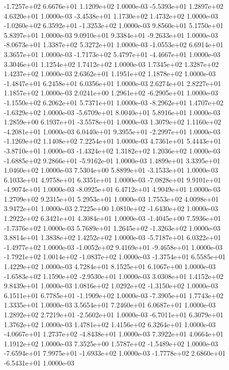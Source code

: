 -1.7257e+02  6.6676e+01  1.1209e+02  1.0000e-03
-5.5393e+01  1.2897e+02  4.6320e+01  1.0000e-03
-3.4538e+01  1.1730e+02  1.4732e+02  1.0000e-03
-1.0260e+02  6.3592e+01 -1.3253e+02  1.0000e-03
9.8560e+01 5.1750e+01 5.8397e+01  1.0000e-03
 9.0910e+01  9.3384e+01 -9.2633e+01  1.0000e-03
-8.0673e+01  1.3387e+02  5.3272e+01  1.0000e-03
-1.0553e+02  6.6914e+01  3.3657e+01  1.0000e-03
-1.7173e+02  5.4797e+01 -4.4667e+01  1.0000e-03
3.3046e+01 1.1254e+02 1.7412e+02  1.0000e-03
1.7345e+02 1.3287e+02 1.4237e+02  1.0000e-03
2.6362e+01 1.1951e+02 1.1878e+02  1.0000e-03
-1.4847e+01  6.2458e+01  6.0356e+01  1.0000e-03
2.6274e+01 2.8227e+01 1.1857e+02  1.0000e-03
 2.0241e+00  1.2961e+02 -6.2905e+01  1.0000e-03
-1.1550e+02  6.2062e+01  5.7371e+01  1.0000e-03
-8.2962e+01  1.4707e+02 -1.6329e+02  1.0000e-03
-5.6709e+01  8.0040e+01  5.8916e+01  1.0000e-03
 1.2859e+00  6.1937e+01 -3.5578e+01  1.0000e-03
 1.3079e+02  1.1160e+02 -4.2081e+01  1.0000e-03
 6.0440e+01  9.3955e+01 -2.2997e+01  1.0000e-03
-1.1269e+02  1.1408e+02  7.2254e+01  1.0000e-03
 4.7361e+01  5.4443e+01 -3.8710e+01  1.0000e-03
-1.4324e+02  1.3182e+02  1.2036e+02  1.0000e-03
-1.6885e+02  9.2866e+01 -5.9162e-01  1.0000e-03
1.4899e+01 3.3395e+01 1.0460e+02  1.0000e-03
 7.5304e+00  5.8899e+01 -3.1533e+01  1.0000e-03
6.1033e+01 4.9758e+01 6.3351e+01  1.0000e-03
-7.0828e+01  9.9101e+01 -4.9074e+01  1.0000e-03
-8.0925e+01  6.4712e+01  4.9049e+01  1.0000e-03
1.2709e+02 9.2315e+01 5.2953e+01  1.0000e-03
1.7553e+02 4.0098e+01 3.9472e+01  1.0000e-03
 2.7225e+00  1.0810e+02 -1.6430e+02  1.0000e-03
1.2922e+02 6.3421e+01 4.3084e+01  1.0000e-03
-1.4045e+00  7.5936e+01 -1.7376e+02  1.0000e-03
 5.7689e+01  1.2645e+02 -1.3263e+02  1.0000e-03
3.8814e+01 1.3838e+02 1.4252e+02  1.0000e-03
-5.7187e+01  6.0322e+01 -1.4977e+02  1.0000e-03
-1.0052e+02  9.4169e+01 -9.4658e+01  1.0000e-03
-1.7921e+02  1.0014e+02 -1.0837e+02  1.0000e-03
-1.3754e+01  6.5585e+01  1.4229e+02  1.0000e-03
4.7284e+01 8.1525e+01 6.1067e+00  1.0000e-03
-1.6583e+02  1.1590e+02 -2.9530e+01  1.0000e-03
3.0308e+01 1.4152e+02 9.8439e+01  1.0000e-03
 1.0816e+02  1.0292e+02 -1.3150e+02  1.0000e-03
 6.1511e+01  6.7785e+01 -1.1909e+02  1.0000e-03
-7.3905e+01  1.7743e+02  1.3335e+01  1.0000e-03
3.5654e+01 7.2460e+01 6.0687e+01  1.0000e-03
 1.2892e+02  2.7219e+01 -2.5602e+01  1.0000e-03
-6.7011e+01  6.3079e+01  1.3762e+02  1.0000e-03
1.4781e+02 1.4156e+02 6.3264e+01  1.0000e-03
-4.0667e+01  1.2737e+02 -4.8438e+01  1.0000e-03
7.3922e+01 4.0664e+01 1.1912e+02  1.0000e-03
 7.3525e+00  1.5787e+02 -1.5489e+02  1.0000e-03
-7.6594e+01  7.9975e+01 -1.6933e+02  1.0000e-03
-1.7778e+02  2.6860e+01 -6.5431e+01  1.0000e-03
